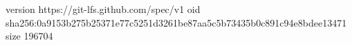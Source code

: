 version https://git-lfs.github.com/spec/v1
oid sha256:0a9153b275b25371e77c5251d3261be87aa5c5b73435b0c891c94e8bdee13471
size 196704
